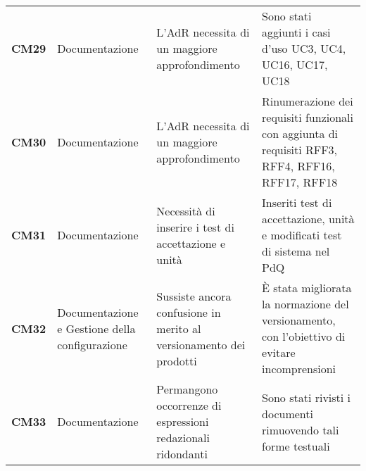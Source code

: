 \documentclass[../piano-di-qualifica.tex]{subfiles}
\begin{document}
\begin{longtable}[H]{>{\centering\bfseries}m{2.5cm} >{\centering}m{2.5cm} >{\centering}m{5.5cm} >{\centering\arraybackslash}m{5.5cm}}
CM29 & Documentazione                                & L’AdR necessita di un maggiore approfondimento                                                                                                                                & Sono stati aggiunti i casi d’uso UC3, UC4, UC16, UC17, UC18                                                                                                                                                                                                                                                                                         \\
CM30 & Documentazione                                & L’AdR necessita di un maggiore approfondimento                                                                                                                                & Rinumerazione dei requisiti funzionali con aggiunta di requisiti RFF3, RFF4, RFF16, RFF17, RFF18                                                                                                                                                                                                                                                    \\
CM31 & Documentazione                                & Necessità di inserire i test di accettazione e unità                                                                                                                          & Inseriti test di accettazione, unità e modificati test di sistema nel PdQ                                                                                                                                                                                                                                                                           \\
CM32 & Documentazione e Gestione della configurazione & Sussiste ancora confusione in merito al versionamento dei prodotti                                                                                                           & È stata migliorata la normazione del versionamento, con l'obiettivo di evitare incomprensioni                                                                                                                                                                                                                                                       \\
CM33 & Documentazione                                & Permangono occorrenze di espressioni redazionali ridondanti                                                                                                                   & Sono stati rivisti i documenti rimuovendo tali forme testuali                                                                                                                                                                                                                                                                                       \\

\end{longtable}
\end{document}
